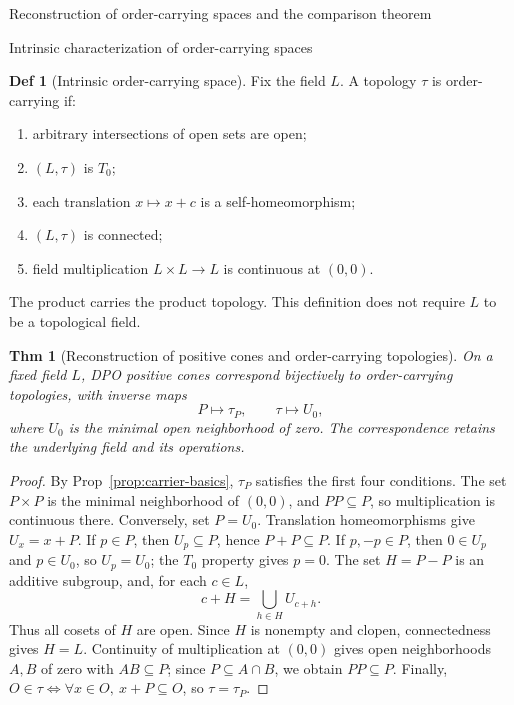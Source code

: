 \documentclass[10pt,letterpaper]{amsart}
\makeatletter
\numberwithin{equation}{section}
\newtheorem{thm}{Thm}[section]
\theoremstyle{definition}
\newtheorem{defn}{Def}[section]
\def\section{\@startsection{section}{1}
  \z@{1.1\linespacing\@plus.5\linespacing}{.6\linespacing}
  {\normalfont\fontsize{13}{16}\selectfont\bfseries\boldmath\centering}}
\def\subsection{\@startsection{subsection}{2}
  \z@{.9\linespacing\@plus.3\linespacing}{.4\linespacing}
  {\normalfont\fontsize{11.5}{14}\selectfont\bfseries\boldmath\raggedright}}
\makeatother
\begin{document}
\section{Reconstruction of order-carrying spaces and the comparison theorem}
\subsection{Intrinsic characterization of order-carrying spaces}
\begin{defn}[Intrinsic order-carrying space]\label{def:intrinsic-carrier}
Fix the field $L$. A topology $\tau$ is order-carrying if:
\begin{enumerate}
\item arbitrary intersections of open sets are open;
\item $(L,\tau)$ is $T_0$;
\item each translation $x\mapsto x+c$ is a self-homeomorphism;
\item $(L,\tau)$ is connected;
\item field multiplication $L\times L\to L$ is continuous at $(0,0)$.
\end{enumerate}
The product carries the product topology. This definition does not require $L$ to be a topological field.
\end{defn}

\begin{thm}[Reconstruction of positive cones and order-carrying topologies]\label{thm:reconstruction}
On a fixed field $L$, DPO positive cones correspond bijectively to order-carrying topologies, with inverse maps
\[
P\longmapsto\tau_P,\qquad
\tau\longmapsto U_0,
\]
where $U_0$ is the minimal open neighborhood of zero. The correspondence retains the underlying field and its operations.
\end{thm}
\begin{proof}
By Prop~\ref{prop:carrier-basics}, $\tau_P$ satisfies the first four conditions. The set $P\times P$ is the minimal neighborhood of $(0,0)$, and $PP\subseteq P$, so multiplication is continuous there.
Conversely, set $P=U_0$. Translation homeomorphisms give $U_x=x+P$. If $p\in P$, then $U_p\subseteq P$, hence $P+P\subseteq P$. If $p,-p\in P$, then $0\in U_p$ and $p\in U_0$, so $U_p=U_0$; the $T_0$ property gives $p=0$.
The set $H=P-P$ is an additive subgroup, and, for each $c\in L$,
\[
c+H=\bigcup_{h\in H}U_{c+h}.
\]
Thus all cosets of $H$ are open. Since $H$ is nonempty and clopen, connectedness gives $H=L$. Continuity of multiplication at $(0,0)$ gives open neighborhoods $A,B$ of zero with $AB\subseteq P$; since $P\subseteq A\cap B$, we obtain $PP\subseteq P$.
Finally, $O\in\tau\iff\forall x\in O,\ x+P\subseteq O$, so $\tau=\tau_P$.
\end{proof}
\end{document}
